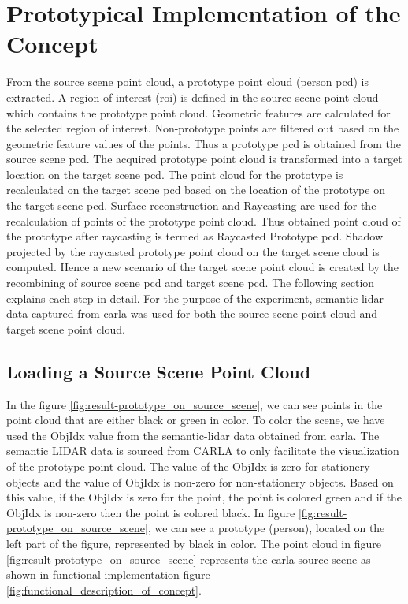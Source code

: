 \chapter{Prototypical Implementation of the Concept}
From the source scene point cloud, a prototype point cloud (person \acrshort{pcd}) is extracted. A region of interest (\acrshort{roi}) is defined in the source scene point cloud which contains the prototype point cloud. Geometric features are calculated for the selected region of interest. Non-prototype points are filtered out based on the geometric feature values of the points. Thus a prototype \acrshort{pcd} is obtained from the source scene \acrshort{pcd}. The acquired prototype point cloud is transformed into a target location on the target scene \acrshort{pcd}. The point cloud for the prototype is recalculated on the target scene \acrshort{pcd} based on the location of the prototype on the target scene \acrshort{pcd}. Surface reconstruction and Raycasting are used for the recalculation of points of the prototype point cloud. Thus obtained point cloud of the prototype after raycasting is termed as Raycasted Prototype \acrshort{pcd}. Shadow projected by the raycasted prototype point cloud on the target scene cloud is computed. Hence a new scenario of the target scene point cloud is created by the recombining of source scene \acrshort{pcd} and target scene \acrshort{pcd}. The following section explains each step in detail. For the purpose of the experiment, semantic-lidar data captured from \acrshort{carla} was used for both the source scene point cloud and target scene point cloud.

\section{Loading a Source Scene Point Cloud}
 In the figure \ref{fig:result-prototype_on_source_scene}, we can see points in the point cloud that are either black or green in color. To color the scene, we have used the ObjIdx value from the semantic-lidar data obtained from \acrshort{carla}. The semantic LIDAR data is sourced from CARLA to only facilitate the visualization of the prototype point cloud. The value of the ObjIdx is zero for stationery objects and the value of ObjIdx is non-zero for non-stationery objects. Based on this value, if the ObjIdx is zero for the point, the point is colored green and if the ObjIdx is non-zero then the point is colored black. In figure \ref{fig:result-prototype_on_source_scene}, we can see a prototype (person), located on the left part of the figure, represented by black in color. The point cloud in figure \ref{fig:result-prototype_on_source_scene} represents the \acrshort{carla} source scene as shown in functional implementation figure \ref{fig:functional_description_of_concept}.

